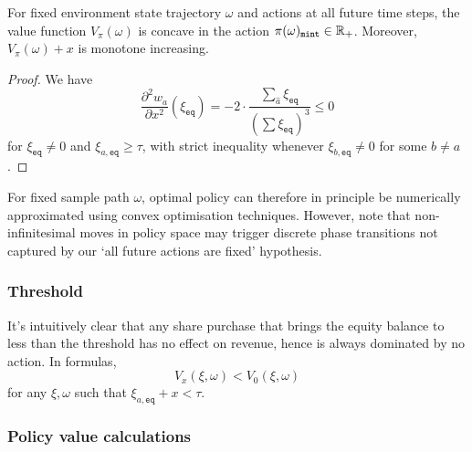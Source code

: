\begin{proposition}

  For fixed environment state trajectory $\omega$ and actions at all future time steps, the value function $V_\pi(\omega)$ is concave in the action $\pi(\omega)_\mathtt{mint}\in\mathbb{R}_+$.
  Moreover, $V_\pi(\omega)+x$ is monotone increasing.

\end{proposition}
%
\begin{proof}

We have
\[
  \frac {\partial^2 w_a} {\partial x^2} (\xi_\mathtt{eq}) = -2\cdot\frac {\sum_{\hat a}\xi_\mathtt{eq}} {(\sum \xi_\mathtt{eq})^3} \leq 0
\]
for $\xi_\mathtt{eq}\neq 0$ and $\xi_{a,\mathtt{eq}}\geq\tau$, with strict inequality whenever $\xi_{b,\mathtt{eq}}\neq 0$ for some $b\neq a$.

\end{proof}

For fixed sample path $\omega$, optimal policy can therefore in principle be numerically approximated using convex optimisation techniques.
%
However, note that non-infinitesimal moves in policy space may trigger discrete phase transitions not captured by our `all future actions are fixed' hypothesis.





\subsubsection{Threshold}
%
It's intuitively clear that any share purchase that brings the equity balance to less than the threshold has no effect on revenue, hence is always dominated by no action.
%
In formulas,
\[
  V_x(\xi,\omega) < V_0(\xi,\omega) 
\]
for any $\xi,\omega$ such that $\xi_{a,\mathtt{eq}}+x <\tau$.





\subsubsection{Policy value calculations}
\label{section:policy-value}

